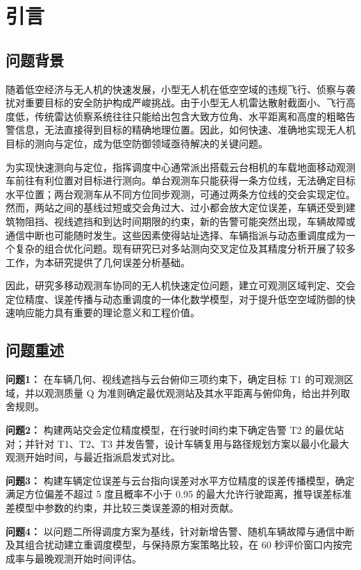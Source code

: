 \section{引言}
\subsection{问题背景}

随着低空经济与无人机的快速发展，小型无人机在低空空域的违规飞行、侦察与袭扰对重要目标的安全防护构成严峻挑战。由于小型无人机雷达散射截面小、飞行高度低，传统雷达侦察系统往往只能给出包含大致方位角、水平距离和高度的粗略告警信息，无法直接得到目标的精确地理位置。因此，如何快速、准确地实现无人机目标的测向与定位，成为低空防御领域亟待解决的关键问题。

为实现快速测向与定位，指挥调度中心通常派出搭载云台相机的车载地面移动观测车前往有利位置对目标进行测向。单台观测车只能获得一条方位线，无法确定目标水平位置；两台观测车从不同方位同步观测，可通过两条方位线的交会实现定位。然而，两站之间的基线过短或交会角过大、过小都会放大定位误差，车辆还受到建筑物阻挡、视线遮挡和到达时间期限的约束，新的告警可能突然出现，车辆故障或通信中断也可能随时发生。这些因素使得站址选择、车辆指派与动态重调度成为一个复杂的组合优化问题。现有研究已对多站测向交叉定位及其精度分析开展了较多工作\cite{wang2007cexiang,liu2008cexiang}，为本研究提供了几何误差分析基础。

因此，研究多移动观测车协同的无人机快速定位问题，建立可观测区域判定、交会定位精度、误差传播与动态重调度的一体化数学模型，对于提升低空空域防御的快速响应能力具有重要的理论意义和工程价值。

\subsection{问题重述}

\textbf{问题1：} 在车辆几何、视线遮挡与云台俯仰三项约束下，确定目标 T1 的可观测区域，并以观测质量 Q 为准则确定最优观测站及其水平距离与俯仰角，给出并列取舍规则。

\textbf{问题2：} 构建两站交会定位精度模型，在行驶时间约束下确定告警 T2 的最优站对；并针对 T1、T2、T3 并发告警，设计车辆复用与路径规划方案以最小化最大观测开始时间，与最近指派启发式对比。

\textbf{问题3：} 构建车辆定位误差与云台指向误差对水平方位精度的误差传播模型，确定满足方位偏差不超过 5 度且概率不小于 0.95 的最大允许行驶距离，推导误差标准差模型中参数的约束，并比较三类误差源的相对贡献。

\textbf{问题4：} 以问题二所得调度方案为基线，针对新增告警、随机车辆故障与通信中断及其组合扰动建立重调度模型，与保持原方案策略比较，在 60 秒评价窗口内按完成率与最晚观测开始时间评估。
